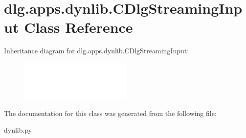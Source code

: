 \hypertarget{classdlg_1_1apps_1_1dynlib_1_1_c_dlg_streaming_input}{}\section{dlg.\+apps.\+dynlib.\+C\+Dlg\+Streaming\+Input Class Reference}
\label{classdlg_1_1apps_1_1dynlib_1_1_c_dlg_streaming_input}
Inheritance diagram for dlg.\+apps.\+dynlib.\+C\+Dlg\+Streaming\+Input\+:\begin{figure}[H]
\begin{center}
\leavevmode
\includegraphics[height=2.000000cm]{classdlg_1_1apps_1_1dynlib_1_1_c_dlg_streaming_input}
\end{center}
\end{figure}


The documentation for this class was generated from the following file\+:\begin{DoxyCompactItemize}
\item 
dynlib.\+py\end{DoxyCompactItemize}
